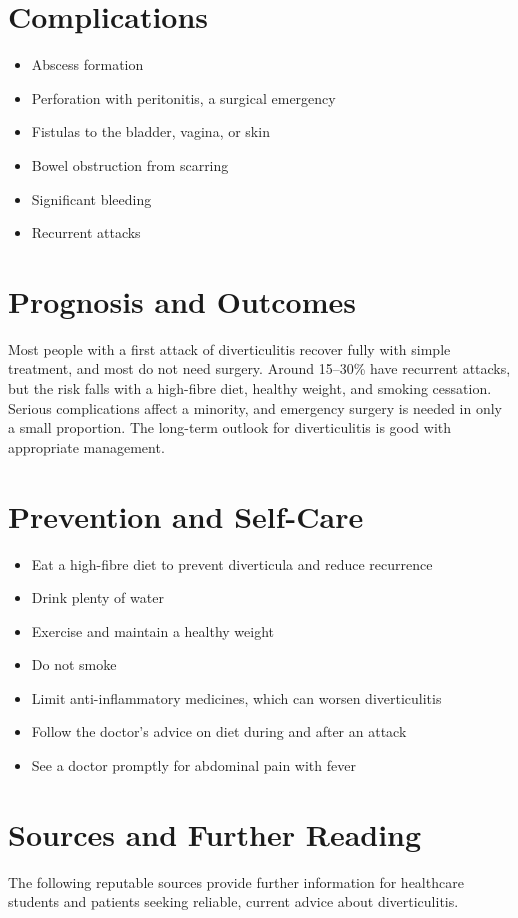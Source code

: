 \section*{Complications}
\begin{itemize}
    \item Abscess formation
    \item Perforation with peritonitis, a surgical emergency
    \item Fistulas to the bladder, vagina, or skin
    \item Bowel obstruction from scarring
    \item Significant bleeding
    \item Recurrent attacks
\end{itemize}

\section*{Prognosis and Outcomes}
Most people with a first attack of diverticulitis recover fully with simple treatment, and most do not need surgery. Around 15--30\% have recurrent attacks, but the risk falls with a high-fibre diet, healthy weight, and smoking cessation. Serious complications affect a minority, and emergency surgery is needed in only a small proportion. The long-term outlook for diverticulitis is good with appropriate management.

\section*{Prevention and Self-Care}
\begin{itemize}
    \item Eat a high-fibre diet to prevent diverticula and reduce recurrence
    \item Drink plenty of water
    \item Exercise and maintain a healthy weight
    \item Do not smoke
    \item Limit anti-inflammatory medicines, which can worsen diverticulitis
    \item Follow the doctor's advice on diet during and after an attack
    \item See a doctor promptly for abdominal pain with fever
\end{itemize}

\section*{Sources and Further Reading}
The following reputable sources provide further information for healthcare students and patients seeking reliable, current advice about diverticulitis.


